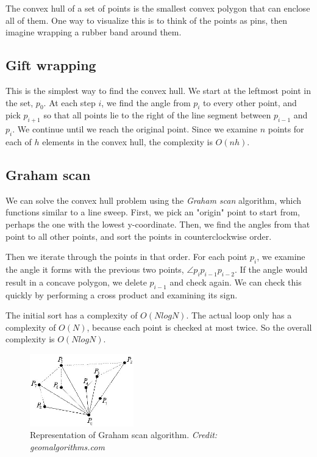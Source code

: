 \documentclass{article}
\begin{document}
The convex hull of a set of points is the smallest convex polygon that can enclose all of them. One way to visualize this is to think of the points as pins, then imagine wrapping a rubber band around them.

\subsection{Gift wrapping}

This is the simplest way to find the convex hull. We start at the leftmost point in the set, $p_0$. At each step $i$, we find the angle from $p_i$ to every other point, and pick $p_{i+1}$ so that all points lie to the right of the line segment between $p_{i-1}$ and $p_i$. We continue until we reach the original point. Since we examine $n$ points for each of $h$ elements in the convex hull, the complexity is $O(nh)$.

\subsection{Graham scan}



We can solve the convex hull problem using the \textit{Graham scan} algorithm, which functions similar to a line sweep. First, we pick an "origin" point to start from, perhaps the one with the lowest y-coordinate. Then, we find the angles from that point to all other points, and sort the points in counterclockwise order.

Then we iterate through the points in that order. For each point $p_i$, we examine the angle it forms with the previous two points, $\angle p_i p_{i-1} p_{i-2}$. If the angle would result in a concave polygon, we delete $p_{i-1}$ and check again. We can check this quickly by performing a cross product and examining its sign.

The initial sort has a complexity of $O(N log N)$. The actual loop only has a complexity of $O(N)$, because each point is checked at most twice. So the overall complexity is $O(N log N)$.

\begin{figure}[h]
  \centering
  \includegraphics[width=0.4\textwidth]{Pic_graham2.jpg}
  \caption{Representation of Graham scan algorithm. \textit{Credit: geomalgorithms.com}}
\end{figure}
\end{document}
